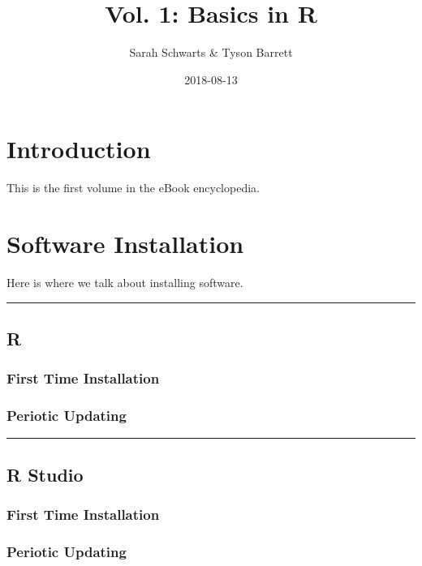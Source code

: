 \documentclass[]{book}
\title{Vol. 1: Basics in R}
\author{Sarah Schwarts \& Tyson Barrett}
\date{2018-08-13}
\begin{document}
\maketitle

{
\setcounter{tocdepth}{1}
\tableofcontents
}
\chapter{Introduction}\label{introduction}

This is the first volume in the eBook encyclopedia.

\chapter{Software Installation}\label{software-installation}

Here is where we talk about installing software.

\begin{center}\rule{0.5\linewidth}{\linethickness}\end{center}

\section{R}\label{r}

\subsection{First Time Installation}\label{first-time-installation}

\subsection{Periotic Updating}\label{periotic-updating}

\begin{center}\rule{0.5\linewidth}{\linethickness}\end{center}

\section{R Studio}\label{r-studio}

\subsection{First Time Installation}\label{first-time-installation-1}

\subsection{Periotic Updating}\label{periotic-updating-1}
\end{document}
